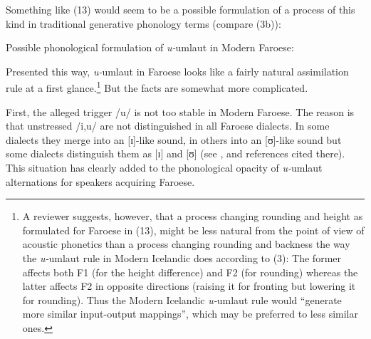 \documentclass[output=paper,
modfonts
]{LSP/langsci}
\begin{document}
\begin{exe}
Something like (13) would seem to be a possible formulation of a process
of this kind in traditional generative phonology terms (compare (3b)):

\ea Possible phonological formulation of \emph{u-}umlaut in Modern
Faroese:\\
\z

Presented this way, \emph{u-}umlaut in Faroese looks like a fairly
natural assimilation rule at a first glance.\footnote{A reviewer
  suggests, however, that a process changing rounding and height as
  formulated for Faroese in (13), might be less natural from the point
  of view of acoustic phonetics than a process changing rounding and
  backness the way the \emph{u-}umlaut rule in Modern Icelandic does
  according to (3): The former affects both F1 (for the height
  difference) and F2 (for rounding) whereas the latter affects F2 in
  opposite directions (raising it for fronting but lowering it for
  rounding). Thus the Modern Icelandic \emph{u-}umlaut rule would
  ``generate more similar input-output mappings'', which may be
  preferred to less similar ones.} But the facts are somewhat more
complicated.

First, the alleged trigger /u/ is not too stable in Modern Faroese. The
reason is that unstressed /i,u/ are not distinguished in all Faroese
dialects. In some dialects they merge into an {[}ɪ{]}-like sound, in
others into an {[}ʊ{]}-like sound but some dialects distinguish them as
{[}ɪ{]} and {[}ʊ{]} (see \citealt[27]{thrainsson2012}, and references
cited there). This situation has clearly added to the phonological
opacity of \emph{u-}umlaut alternations for speakers acquiring Faroese.


\end{exe}
\end{document}
